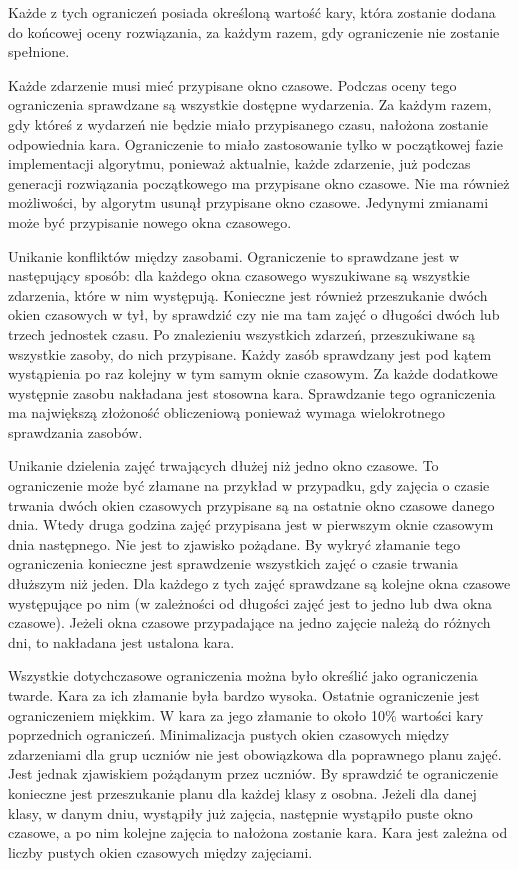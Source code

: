 Każde z tych ograniczeń posiada określoną wartość kary, która zostanie dodana do końcowej oceny rozwiązania, za każdym razem, gdy ograniczenie nie zostanie spełnione.

Każde zdarzenie musi mieć przypisane okno czasowe. Podczas oceny tego ograniczenia sprawdzane są wszystkie dostępne wydarzenia. Za każdym razem, gdy któreś z wydarzeń nie będzie miało przypisanego czasu, nałożona zostanie odpowiednia kara. Ograniczenie to miało zastosowanie tylko w początkowej fazie implementacji algorytmu, ponieważ aktualnie, każde zdarzenie, już podczas generacji rozwiązania początkowego ma przypisane okno czasowe. Nie ma również możliwości, by algorytm usunął przypisane okno czasowe. Jedynymi zmianami może być przypisanie nowego okna czasowego.

Unikanie konfliktów między zasobami. Ograniczenie to sprawdzane jest w następujący sposób: dla każdego okna czasowego wyszukiwane są wszystkie zdarzenia, które w nim występują. Konieczne jest również przeszukanie dwóch okien czasowych w tył, by sprawdzić czy nie ma tam zajęć o długości dwóch lub trzech jednostek czasu. Po znalezieniu wszystkich zdarzeń, przeszukiwane są wszystkie zasoby, do nich przypisane. Każdy zasób sprawdzany jest pod kątem wystąpienia po raz kolejny w tym samym oknie czasowym. Za każde dodatkowe występnie zasobu nakładana jest stosowna kara. Sprawdzanie tego ograniczenia ma największą złożoność obliczeniową ponieważ wymaga wielokrotnego sprawdzania zasobów.

Unikanie dzielenia zajęć trwających dłużej niż jedno okno czasowe. To ograniczenie może być złamane na przykład w przypadku, gdy zajęcia o czasie trwania dwóch okien czasowych przypisane są na ostatnie okno czasowe danego dnia. Wtedy druga godzina zajęć przypisana jest w pierwszym oknie czasowym dnia następnego. Nie jest to zjawisko pożądane. By wykryć złamanie tego ograniczenia konieczne jest sprawdzenie wszystkich zajęć o czasie trwania dłuższym niż jeden. Dla każdego z tych zajęć sprawdzane są kolejne okna czasowe występujące po nim (w zależności od długości zajęć jest to jedno lub dwa okna czasowe). Jeżeli okna czasowe przypadające na jedno zajęcie należą do różnych dni, to nakładana jest ustalona kara.

Wszystkie dotychczasowe ograniczenia można było określić jako ograniczenia twarde. Kara za ich złamanie była bardzo wysoka. Ostatnie ograniczenie jest ograniczeniem miękkim. W kara za jego złamanie to około 10\% wartości kary poprzednich ograniczeń. Minimalizacja pustych okien czasowych między zdarzeniami dla grup uczniów nie jest obowiązkowa dla poprawnego planu zajęć. Jest jednak zjawiskiem pożądanym przez uczniów. By sprawdzić te ograniczenie konieczne jest przeszukanie planu dla każdej klasy z osobna. Jeżeli dla danej klasy, w danym dniu, wystąpiły już zajęcia, następnie wystąpiło puste okno czasowe, a po nim kolejne zajęcia to nałożona zostanie kara. Kara jest zależna od liczby pustych okien czasowych między zajęciami.

